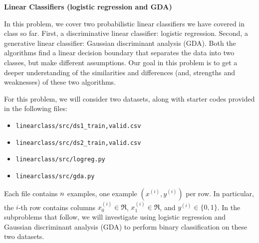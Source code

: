 \item {} {\bf Linear Classifiers (logistic regression and GDA)}

In this problem, we cover two probabilistic linear classifiers we have covered in class so far. First, a discriminative linear classifier: logistic regression. Second, a generative linear classifier: Gaussian discriminant analysis (GDA). Both the algorithms find a linear decision boundary that separates the data into two classes, but make different assumptions. Our goal in this problem is to get a deeper understanding of the similarities and differences (and, strengths and weaknesses) of these two algorithms.

For this problem, we will consider two datasets, along with starter codes provided in the following files:
\begin{center}
\begin{itemize} %
	\item \texttt{linearclass/src/ds1\_{train,valid}.csv}
	\item \texttt{linearclass/src/ds2\_{train,valid}.csv}
        \item \texttt{linearclass/src/logreg.py}
        \item \texttt{linearclass/src/gda.py}
\end{itemize}
\end{center}
Each file contains ${n}$ examples, one example $(x^{(i)}, y^{(i)})$ per row. In particular, the $i$-th row contains columns $x^{(i)}_0\in\Re$, $x^{(i)}_1\in\Re$, and $y^{(i)}\in\{0, 1\}$. In the subproblems that follow, we will investigate using logistic regression and Gaussian discriminant analysis (GDA) to perform binary classification on these two datasets.

\begin{enumerate}
	
        \ifnum{} {
            
        } \fi

	
        \ifnum{} {
            
        } \fi


	
        \ifnum{} {
            
        }\fi

	
        \ifnum{} {
            
        } \fi

	
        \ifnum{} {
            
        } \fi

	
        \ifnum{} {
            
        } \fi

	
        \ifnum{}\fi

	
        \ifnum{}\fi

\end{enumerate}
